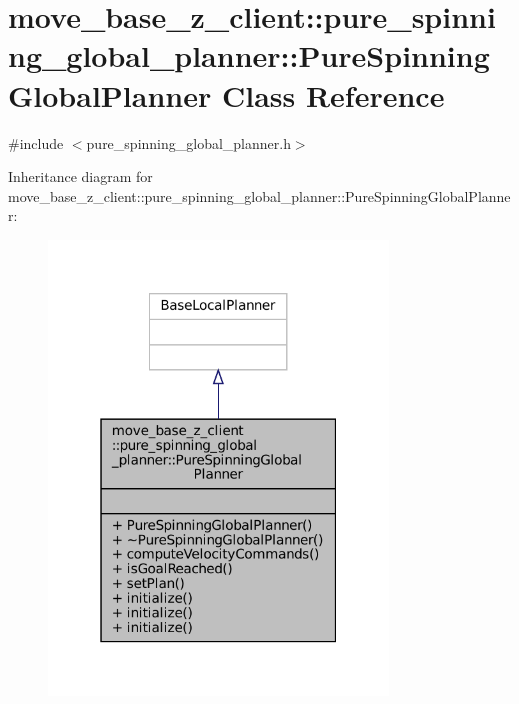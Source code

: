 \hypertarget{classmove__base__z__client_1_1pure__spinning__global__planner_1_1PureSpinningGlobalPlanner}{}\section{move\+\_\+base\+\_\+z\+\_\+client\+:\+:pure\+\_\+spinning\+\_\+global\+\_\+planner\+:\+:Pure\+Spinning\+Global\+Planner Class Reference}
\label{classmove__base__z__client_1_1pure__spinning__global__planner_1_1PureSpinningGlobalPlanner}


{\ttfamily \#include $<$pure\+\_\+spinning\+\_\+global\+\_\+planner.\+h$>$}



Inheritance diagram for move\+\_\+base\+\_\+z\+\_\+client\+:\+:pure\+\_\+spinning\+\_\+global\+\_\+planner\+:\+:Pure\+Spinning\+Global\+Planner\+:
\nopagebreak
\begin{figure}[H]
\begin{center}
\leavevmode
\includegraphics[width=256pt]{classmove__base__z__client_1_1pure__spinning__global__planner_1_1PureSpinningGlobalPlanner__inherit__graph}
\end{center}
\end{figure}


